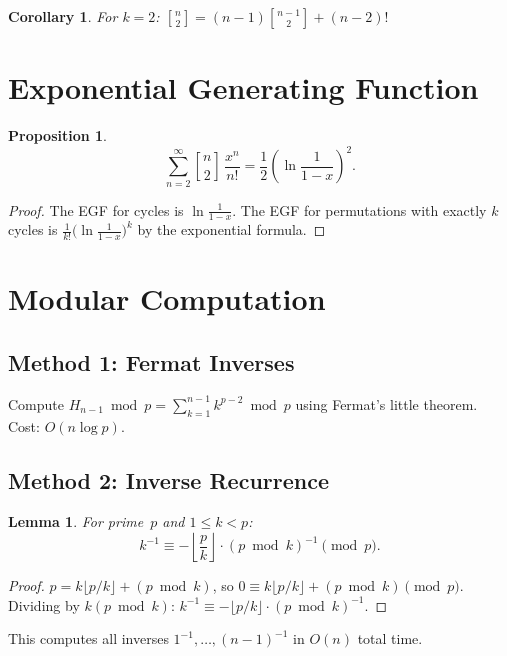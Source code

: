 \documentclass[11pt]{article}
\newtheorem{lemma}[theorem]{Lemma}
\newtheorem{corollary}[theorem]{Corollary}
\newtheorem{proposition}[theorem]{Proposition}
\begin{document}
\begin{corollary}
For $k=2$: $\genfrac{[}{]}{0pt}{}{n}{2} = (n-1)\genfrac{[}{]}{0pt}{}{n-1}{2} + (n-2)!$
\end{corollary}

\section{Exponential Generating Function}

\begin{proposition}
\[
\sum_{n=2}^{\infty} \genfrac{[}{]}{0pt}{}{n}{2}\,\frac{x^n}{n!} = \frac{1}{2}\!\left(\ln\frac{1}{1-x}\right)^{\!2}.
\]
\end{proposition}

\begin{proof}
The EGF for cycles is $\ln\frac{1}{1-x}$. The EGF for permutations with exactly $k$ cycles is $\frac{1}{k!}\bigl(\ln\frac{1}{1-x}\bigr)^k$ by the exponential formula.
\end{proof}

\section{Modular Computation}

\subsection{Method 1: Fermat Inverses}

Compute $H_{n-1} \bmod p = \sum_{k=1}^{n-1} k^{p-2} \bmod p$ using Fermat's little theorem. Cost: $O(n \log p)$.

\subsection{Method 2: Inverse Recurrence}

\begin{lemma}
For prime~$p$ and $1 \le k < p$:
\[
k^{-1} \equiv -\!\left\lfloor\frac{p}{k}\right\rfloor \cdot (p \bmod k)^{-1} \pmod{p}.
\]
\end{lemma}

\begin{proof}
$p = k\lfloor p/k\rfloor + (p \bmod k)$, so $0 \equiv k\lfloor p/k\rfloor + (p\bmod k) \pmod{p}$. Dividing by $k(p\bmod k)$: $k^{-1} \equiv -\lfloor p/k\rfloor \cdot (p\bmod k)^{-1}$.
\end{proof}

This computes all inverses $1^{-1}, \ldots, (n-1)^{-1}$ in $O(n)$ total time.
\end{document}
